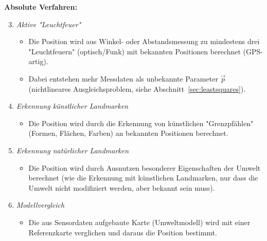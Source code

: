 		\textbf{Absolute Verfahren:}
		\begin{enumerate} \setcounter{enumi}{2}
			\item \emph{Aktive "Leuchtfeuer"}
				\begin{itemize}
					\item Die Position wird aus Winkel- oder Abstandsmessung zu mindestens drei "Leuchtfeuern" (optisch/Funk) mit bekannten Positionen berechnet (GPS-artig).
					\item Dabei entstehen mehr Messdaten als unbekannte Parameter \(\vec{p}\) (nichtlineares Ausgleichsproblem, siehe Abschnitt~\ref{sec:leastsquares}).
				\end{itemize}
			\item \emph{Erkennung künstlicher Landmarken}
				\begin{itemize}
					\item Die Position wird durch die Erkennung von künstlichen "Grenzpfählen" (Formen, Flächen, Farben) an bekannten Positionen berechnet.
				\end{itemize}
			\item \emph{Erkennung natürlicher Landmarken}
				\begin{itemize}
					\item Die Position wird durch Ausnutzen besonderer Eigenschaften der Umwelt berechnet (wie die Erkennung mit künstlichen Landmarken, nur dass die Umwelt nicht modifiziert werden, aber bekannt sein muss).
				\end{itemize}
			\item \emph{Modellvergleich}
				\begin{itemize}
					\item Die aus Sensordaten aufgebaute Karte (Umweltmodell) wird mit einer Referenzkarte verglichen und daraus die Position bestimmt.
				\end{itemize}
		\end{enumerate}
	
